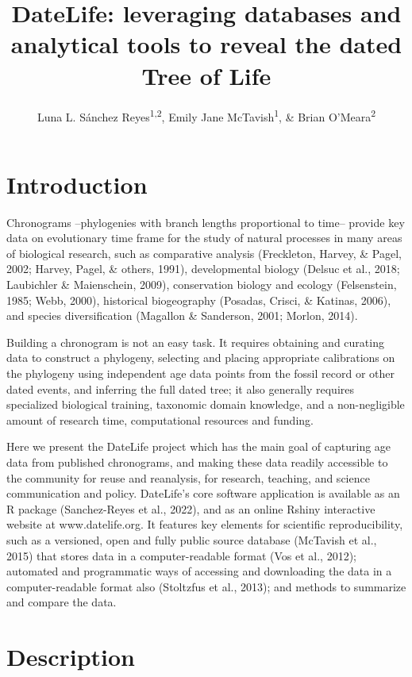 \documentclass[english,man]{apa6}
\title{DateLife: leveraging databases and analytical tools to reveal the dated Tree of Life}
\author{Luna L. Sánchez Reyes\textsuperscript{1,2}, Emily Jane McTavish\textsuperscript{1}, \& Brian O'Meara\textsuperscript{2}}
\date{}
\affiliation{\vspace{0.5cm}\textsuperscript{1} University of California, Merced, USA\\\textsuperscript{2} University of Tennessee, Knoxville, USA}
\begin{document}
\maketitle

\hypertarget{introduction}{%
\section{Introduction}\label{introduction}}

Chronograms --phylogenies with branch lengths proportional to time-- provide key data on evolutionary time frame for the study of natural processes in many areas of biological research, such as comparative analysis (Freckleton, Harvey, \& Pagel, 2002; Harvey, Pagel, \& others, 1991), developmental biology (Delsuc et al., 2018; Laubichler \& Maienschein, 2009), conservation biology and ecology (Felsenstein, 1985; Webb, 2000), historical biogeography (Posadas, Crisci, \& Katinas, 2006), and species diversification (Magallon \& Sanderson, 2001; Morlon, 2014).

Building a chronogram is not an easy task.
It requires obtaining and curating data to construct a phylogeny, selecting and placing appropriate calibrations on the phylogeny using independent age data points from the fossil record or other dated events, and inferring the full dated tree;
it also generally requires specialized biological training, taxonomic domain knowledge, and a non-negligible amount of research time, computational resources and funding.

Here we present the DateLife project which has the main goal of capturing age data from published chronograms, and making these data readily accessible to the community for reuse and reanalysis, for research, teaching, and science communication and policy.
DateLife's core software application is available as an R package (Sanchez-Reyes et al., 2022), and as an online Rshiny interactive website at www.datelife.org. It features key elements for scientific reproducibility, such as a versioned, open and fully public source database (McTavish et al., 2015) that stores data in a computer-readable format (Vos et al., 2012); automated and programmatic ways of accessing and downloading the data in a computer-readable format also (Stoltzfus et al., 2013); and methods to summarize and compare the data.

\hypertarget{description}{%
\section{Description}\label{description}}
\end{document}
